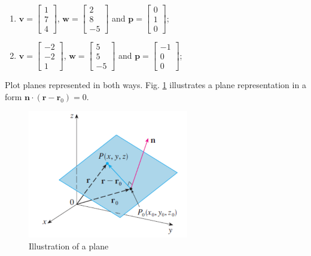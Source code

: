 \documentclass[12pt]{article}%
\begin{document}
\begin{enumerate}
    \item  $\mathbf{v}=\begin{bmatrix} 1 \\ 7 \\ 4 \end{bmatrix}$, $\mathbf{w}=\begin{bmatrix} 2 \\ 8 \\ -5 \end{bmatrix}$ and $\mathbf{p}=\begin{bmatrix} 0 \\ 1 \\ 0 \end{bmatrix}$;
    
    \item $\mathbf{v}=\begin{bmatrix} -2 \\ -2 \\ 1 \end{bmatrix}$, $\mathbf{w}=\begin{bmatrix} 5 \\ 5 \\ -5 \end{bmatrix}$ and $\mathbf{p}=\begin{bmatrix} -1 \\ 0 \\ 0 \end{bmatrix}$;
\end{enumerate}

Plot planes represented in both ways. Fig. \ref{fig:plane} illustrates a plane representation in a form $\mathbf{n} \cdot (\mathbf{r}-\mathbf{r}_0) = 0$. 

\begin{figure}[h]
\begin{center}
\includegraphics[width=7cm]{3d_plane.png}
\caption{Illustration of a plane}
\label{fig:plane}
\end{center}
\end{figure}
\end{document}
